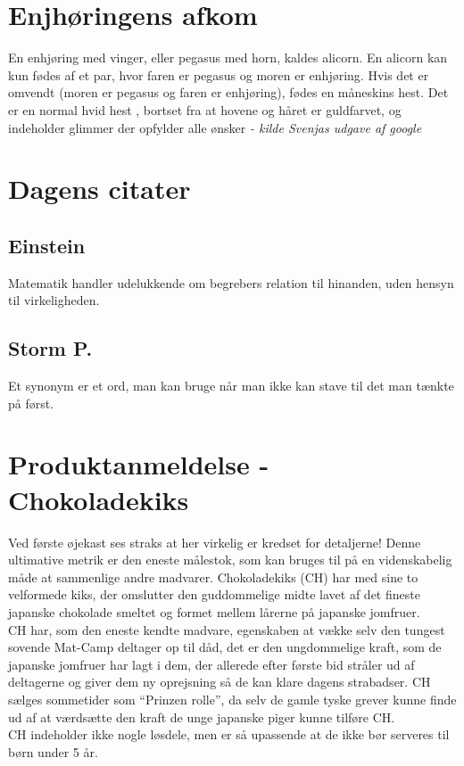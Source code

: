 \begin{minipage}[t]{120mm}
\vspace{3mm}
\section*{Enjhøringens afkom}
En enhjøring med vinger, eller pegasus med horn, kaldes alicorn.
En alicorn kan kun fødes af et par, hvor faren er pegasus og moren er enhjøring.
Hvis det er omvendt (moren er pegasus og faren er enhjøring), fødes en måneskins hest. Det er en normal hvid hest , bortset fra at hovene og håret er guldfarvet, og indeholder glimmer der opfylder alle ønsker
{\flushright\emph{- kilde Svenjas udgave af google}}

\section*{Dagens citater}

\subsection*{Einstein}
Matematik handler udelukkende om begrebers relation til hinanden, uden hensyn til virkeligheden. 

\subsection*{Storm P.}
Et synonym er et ord, man kan bruge når man ikke kan stave til det man tænkte på først. 

\section*{Produktanmeldelse - Chokoladekiks}
Ved første øjekast ses straks at her virkelig er kredset for detaljerne! Denne ultimative metrik er den eneste målestok, som kan bruges til på en videnskabelig måde at sammenlige andre madvarer. Chokoladekiks (CH) har med sine to velformede kiks, der omslutter den guddommelige midte lavet af det fineste japanske chokolade smeltet og formet mellem lårerne på japanske jomfruer. \\
CH har, som den eneste kendte madvare, egenskaben at vække selv den tungest sovende Mat-Camp deltager op til dåd, det er den ungdommelige kraft, som de japanske jomfruer har lagt i dem, der allerede efter første bid stråler ud af deltagerne og giver dem ny oprejsning så de kan klare dagens strabadser. CH sælges sommetider som ``Prinzen rolle'', da selv de gamle tyske grever kunne finde ud af at værdsætte den kraft de unge japanske piger kunne tilføre CH.\\
CH indeholder ikke nogle løsdele, men er så upassende at de ikke bør serveres til børn under 5 år.


\end{minipage}
